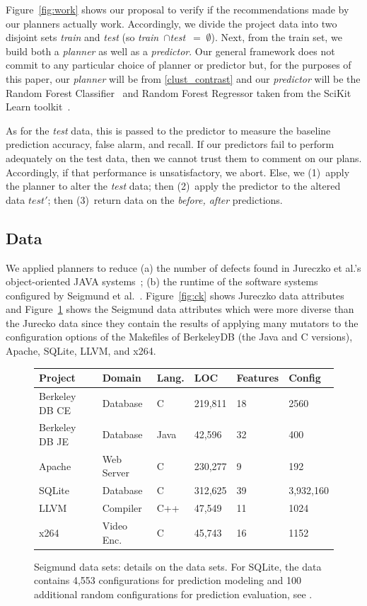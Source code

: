 \documentclass{sig-alternate}
\newcommand{\fig}[1]{Figure~\ref{fig:#1}}
\begin{document}
\fig{work} shows our proposal to verify if the recommendations made by our planners actually work. Accordingly, we divide the
project data  into two disjoint sets {\em train} and {\em test}
(so \mbox{{\em train} $\cap ${\em test} $=\;\emptyset$}).
Next, from the train set, we build both a {\em planner} as well
as a {\em  predictor}. Our general framework does not   commit to any particular choice of { planner} or { predictor} but, for the purposes of this paper, our {\em planner} will be from \ref{clust_contrast} and our {\em predictor} will be the Random Forest Classifier~\cite{Breiman2001} and Random Forest Regressor taken from the SciKit Learn toolkit~\cite{Pedregosa2012}.  

As for the {\em test} data, this is passed to the { predictor}
to measure the baseline prediction accuracy, false alarm, and recall.
If our { predictors} fail to perform adequately on the test data,
then we cannot trust them to comment on our plans. Accordingly,
if that performance is unsatisfactory, we abort.
Else, we (1)~apply the { planner} to alter the {\em test} data;
then (2)~apply the { predictor} to the altered data $test'$;
then (3)~return data on the {\em before, after} predictions.

\subsection{Data}

We applied planners to reduce (a) the number of defects found in Jureczko et al.'s object-oriented JAVA systems~\cite{jureczko10}; (b) the runtime of the  software systems   configured by  Seigmund et al.~\cite{sven12}. \fig{ck} shows Jureczko data attributes and \fig{cpm} shows the  Seigmund data attributes which were more diverse than the Jurecko data since they contain the results of applying many  mutators to the configuration options of the Makefiles of  BerkeleyDB (the Java  and  C versions),  Apache,  SQLite,  LLVM, and x264.  



\begin{figure}[!t]
\scriptsize
\begin{tabular}{llllll}
  \hline
  \rowcolor{lightgray}
Project & Domain & Lang. & LOC & Features & Config\\\hline
Berkeley DB CE & Database & C & 219,811 & 18 & 2560\\
Berkeley DB JE & Database & Java & 42,596 & 32  & 400\\
Apache & Web Server & C & 230,277 & 9 & 192\\
SQLite & Database & C & 312,625 & 39 & 3,932,160\\
LLVM & Compiler & C++ & 47,549 & 11 & 1024\\
x264 & Video Enc. & C& 45,743 & 16 & 1152\\\hline
\end{tabular}
 
\caption{Seigmund data sets: details on the data sets.
For SQLite, the data  contains 4,553 configurations for prediction modeling and 100 additional random configurations for prediction evaluation, see \cite{vapp}.}\label{fig:cpm}
\end{figure}
\end{document}
